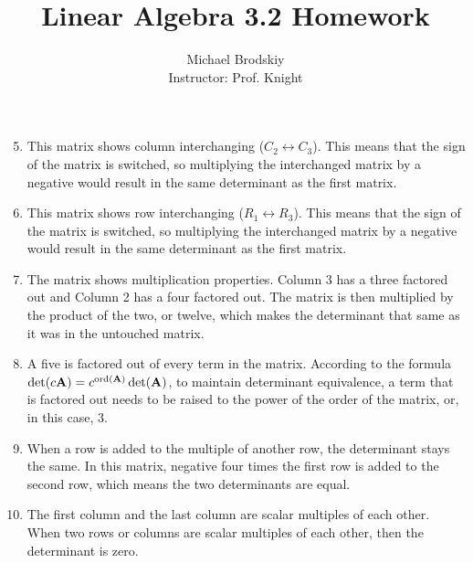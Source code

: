 \documentclass[12pt]{article}
\title{Linear Algebra 3.2 Homework}
\date{}
\author{Michael Brodskiy\\ \small Instructor: Prof. Knight}
\begin{document}
\maketitle

\begin{enumerate}


    \setcounter{enumi}{4}

  \item This matrix shows column interchanging ($C_2\leftrightarrow C_3$). This means that the sign of the matrix is switched, so multiplying the interchanged matrix by a negative would result in the same determinant as the first matrix.

  \item This matrix shows row interchanging ($R_1\leftrightarrow R_3$). This means that the sign of the matrix is switched, so multiplying the interchanged matrix by a negative would result in the same determinant as the first matrix.

    \setcounter{enumi}{8}

  \item The matrix shows multiplication properties. Column 3 has a three factored out and Column 2 has a four factored out. The matrix is then multiplied by the product of the two, or twelve, which makes the determinant that same as it was in the untouched matrix.

    \setcounter{enumi}{10}

  \item A five is factored out of every term in the matrix. According to the formula $\det(c\bold{A})=c^{\text{ord}(\bold{A})}\det(\bold{A})$, to maintain determinant equivalence, a term that is factored out needs to be raised to the power of the order of the matrix, or, in this case, 3.

    \setcounter{enumi}{12}

  \item When a row is added to the multiple of another row, the determinant stays the same. In this matrix, negative four times the first row is added to the second row, which means the two determinants are equal.

    \setcounter{enumi}{18}

  \item The first column and the last column are scalar multiples of each other. When two rows or columns are scalar multiples of each other, then the determinant is zero.

    \setcounter{enumi}{24}


\end{enumerate}
\end{document}
